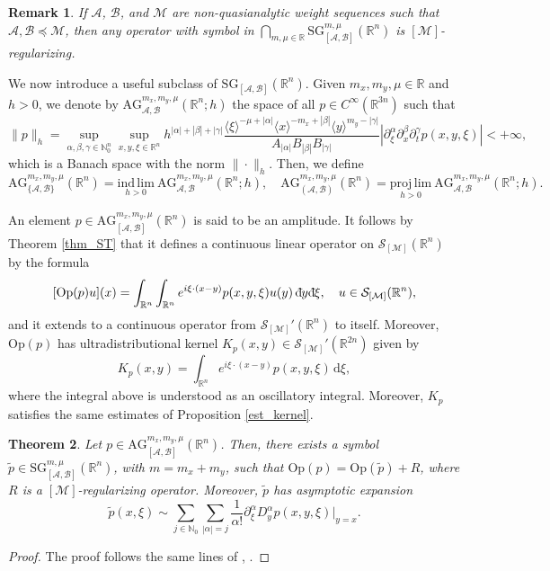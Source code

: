 \documentclass[11pt,reqno]{amsart}
\numberwithin{equation}{section}
\newcommand{\dbar}{\mathrm{d}\hspace*{-0.15em}\bar{}\hspace*{0.1em}}
\newtheorem{theorem}{Theorem}[section]
\newtheorem{remark}[theorem]{Remark}
\newcommand{\R}{{\mathbb{R}}} %
\newcommand{\N}{{\mathbb{N}}} %
\newcommand{\caS}{{\mathcal{S}}}
\newcommand{\Op}{{\mathrm{Op}}}
\newcommand{\SG}{{\mathrm{SG}}}
\newcommand{\AG}{{\mathrm{AG}}}
\newcommand{\M}{{\mathcal{M}}} %
\newcommand{\A}{{\mathcal{A}}} %
\newcommand{\B}{{\mathcal{B}}} %
\begin{document}
\begin{remark}
	If $\A$, $\B$, and $\M$ are non-quasianalytic weight sequences such that $\A,\B\preceq \M$, then any operator with symbol in $\bigcap_{m,\mu\in\R}{\SG}_{[\A,\B]}^{m,\mu}(\R^n)$ is $[\M]$-regularizing.
\end{remark}



We now introduce a useful subclass of $\SG_{[\A,\B]}(\R^n)$. Given $m_x,m_y,\mu\in\R$ and $h>0$, we denote by $\AG_{\A,\B}^{m_x,m_y,\mu}(\R^n;h)$ 
the space of all $p\in C^\infty(\R^{3n})$ such that
%
\[\|p\|_h = \sup_{\alpha,\beta,\gamma\in\N_0^n}\sup_{x,y,\xi\in\R^n} h^{|\alpha|+|\beta|+|\gamma|} \frac{\langle \xi \rangle^{-\mu+|\alpha|}\langle x\rangle^{-m_x+|\beta|}\langle y\rangle^{m_y-|\gamma|}}{A_{|\alpha|} B_{|\beta|}B_{|\gamma|}}|\partial_\xi^\alpha\partial_x^\beta\partial_t^\gamma p(x,y,\xi)|<+\infty,\]
%
which is a Banach space with the norm $\|\cdot\|_h$. Then, we define
%
\[\AG_{\{\A,\B\}}^{m_x,m_y,\mu}(\R^n) = \underset{h>0}{\mathrm{ind\,lim}}\ \AG_{\A,\B}^{m_x,m_y,\mu}(\R^n;h),
\quad
\AG_{(\A,\B)}^{m_x,m_y,\mu}(\R^n) = \underset{h>0}{\mathrm{proj\,lim}}\ \AG_{\A,\B}^{m_x,m_y,\mu}(\R^n;h).\]

An element $p\in \AG_{[\A,\B]}^{m_x,m_y,\mu}(\R^n)$ is said to be an amplitude. It follows by Theorem \ref{thm_ST} that it defines a continuous linear operator on 
$\caS_{[\M]}(\R^n)$ by the formula
%
\begin{equation}\label{ampl_formula}
	[\Op(p)u](x) = \int_{\R^n}\int_{\R^n} e^{i\xi\cdot (x-y)}p(x,y,\xi)u(y)\,\dbar y\dbar \xi,\quad u\in \caS_{[\M]}(\R^n),
\end{equation}
%
and it extends to a continuous operator from $\caS_{[\M]}'(\R^n)$ to itself. Moreover, $\Op(p)$ has ultradistributional kernel $K_p(x,y) \in \caS_{[\M]}'(\R^{2n})$ given by
%
\begin{equation*}
	K_p(x,y) = \int_{\R^n} e^{i\xi\cdot(x-y)} p(x,y,\xi)\,\mathrm{d}\xi,
\end{equation*}
%
where the integral above is understood as an oscillatory integral. Moreover, $K_p$ satisfies the same estimates of Proposition \ref{est_kernel}.



\begin{theorem}\label{symbol_ampl}
	Let $p\in \AG_{[\A,\B]}^{m_x,m_y,\mu}(\R^n)$. Then, there exists a symbol $\tilde{p}\in {\SG}_{[\A,\B]}^{m,\mu}(\R^n)$, with $m=m_x+m_y$, such that $\Op(p)=\Op(\tilde{p})+R$, where $R$ is a $[\M]$-regularizing operator. Moreover, $\tilde{p}$ has asymptotic expansion
	\[\tilde{p}(x,\xi) \sim \sum_{j\in\N_0}\sum_{|\alpha|=j}\frac{1}{\alpha!}\partial_\xi^\alpha D_y^\alpha p(x,y,\xi)|_{y=x}.\]
\end{theorem}
%
\begin{proof}
	The proof follows the same lines of \cite[Theorem 6.3.14]{NicRod}, . 
\end{proof}
\end{document}
